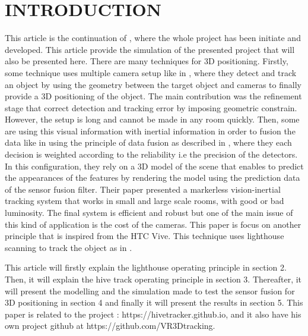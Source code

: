 \documentclass{vldb}
\begin{document}
\section{INTRODUCTION}
This article is the continuation of \cite{cedric}, where the whole project has been initiate and developed. This article provide the simulation of the presented project that will also be presented here. \newline
There are many techniques for 3D positioning. Firstly, some technique uses multiple camera setup like in \cite{lee2013real}, where they detect and track an object by using the geometry between the target object and cameras to finally provide a 3D positioning of the object. The main contribution was the refinement stage that correct detection and tracking error by imposing geometric constrain. However, the setup is long and cannot be made in any room quickly. \newline
Then, some are using this visual information with inertial information in order to fusion the data like in \cite{bleser2009advanced} using the principle of data fusion as described in \cite{chair1986optimal}, where they each decision is weighted according to the reliability i.e the precision of the detectors. In this configuration, they rely on a 3D model of the scene that enables to predict the appearances of the features by rendering the model using the prediction data of the
sensor fusion filter. Their paper presented a markerless vision-inertial tracking system that works in small and large scale rooms, with good or bad luminosity. The final system is efficient and robust but one of the main issue of this kind of application is the cost of the cameras.\newline
This paper is focus on another principle that is inspired from the HTC Vive. This technique uses lighthouse scanning to track the object as in \cite{kreylos2016lighthouse}. \newline

This article will firstly explain the lighthouse operating principle in section 2. Then, it will explain the hive track operating principle in section 3. Thereafter, it will present the modelling and the simulation made to test the sensor fusion for 3D positioning in section 4 and finally it will present the results in section 5. This paper is related to the project : https://hivetracker.github.io, and it also have his own project github at \newline https://github.com/VR3Dtracking.
\end{document}
